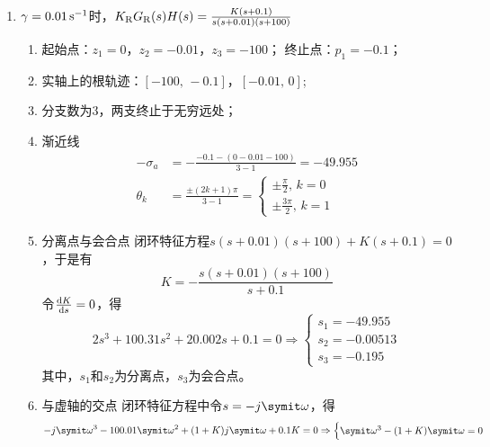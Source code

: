 \begin{exercise} %
    \begin{enumerate}
        \item $\gamma = 0.01\,{\rm s}^{-1}$时，$K_{\rm R}G_{\rm R}(s)H(s) = \frac{K(s+0.1)}{s(s+0.01)(s+100)}$
        \begin{enumerate}
            \item 起始点：$z_1 = 0$，$z_2 = -0.01$，$z_3 = -100$；
            终止点：$p_1 = -0.1$；
            \item 实轴上的根轨迹：$[-100,\,-0.1]$，$[-0.01,\,0]$;
            \item 分支数为3，两支终止于无穷远处；
            \item 渐近线
            \begin{align*}
                -\sigma_a &= -\frac{-0.1-(0-0.01-100)}{3-1} = -49.955 \\
                \theta_k &= \frac{\pm (2k+1)\pi}{3-1} = \begin{cases}
                    \pm \frac{\pi}{2},\,k=0 \\
                    \pm \frac{3\pi}{2},\,k=1
                \end{cases}
            \end{align*}
            \item 分离点与会合点
            闭环特征方程$s(s+0.01)(s+100)+K(s+0.1) = 0$，于是有
            \begin{equation*}
                K = -\frac{s(s+0.01)(s+100)}{s+0.1}
            \end{equation*}
            令$\frac{{\rm{d}}{K}}{{\rm{d}}{s}} = 0$，得
            \begin{equation*}
                2s^3 + 100.31s^2 + 20.002s + 0.1 = 0 \Rightarrow \begin{cases}
                    s_1 = -49.955 \\
                    s_2 = -0.00513 \\
                    s_3 = -0.195
                \end{cases}
            \end{equation*}
            其中，$s_1$和$s_2$为分离点，$s_3$为会合点。
            \item 与虚轴的交点
            闭环特征方程中令$s=-j\varomega$，得
            \begin{equation*}
                -j\varomega^3 - 100.01\varomega^2 + (1+K)j\varomega + 0.1K = 0 \Rightarrow \begin{cases}
                    \varomega^3 - (1+K) \varomega = 0 \\

\end{cases}
\end{equation*}
\end{enumerate}
\end{enumerate}
\end{exercise}
